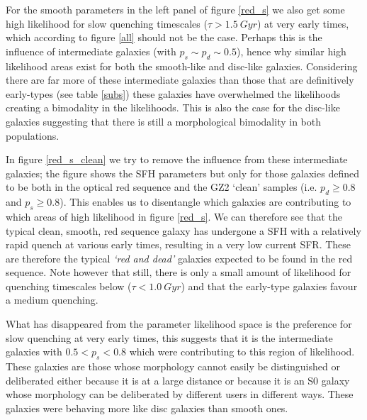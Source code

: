 \documentclass{mn2e}
\begin{document}
For the smooth parameters in the left panel of figure \ref{red_s} we also get some high likelihood for slow quenching timescales ($\tau > 1.5~Gyr$) at very early times, which according to figure \ref{all} should not be the case. Perhaps this is the influence of intermediate galaxies (with $p_s \sim p_d \sim 0.5$), hence why similar high likelihood areas exist for both the smooth-like and disc-like galaxies. Considering there are far more of these intermediate galaxies than those that are definitively early-types (see table \ref{subs}) these galaxies have overwhelmed the likelihoods creating a bimodality in the likelihoods. This is also the case for the disc-like galaxies suggesting that there is still a morphological bimodality in both populations.

In figure \ref{red_s_clean} we try to remove the influence from these intermediate galaxies; the figure shows the SFH parameters but only for those galaxies defined to be both in the optical red sequence and the GZ2 `clean' samples (i.e. $p_d \geq 0.8$ and $p_s \geq 0.8$). This enables us to disentangle which galaxies are contributing to which areas of high likelihood in figure \ref{red_s}. We can therefore see that the typical clean, smooth, red sequence galaxy has undergone a SFH with a relatively rapid quench at various early times, resulting in a very low current SFR. These are therefore the typical \emph{`red and dead'} galaxies expected to be found in the red sequence. Note however that still, there is only a small amount of likelihood for quenching timescales below ($\tau < 1.0~Gyr$) and that the early-type galaxies favour a medium quenching. 

What has disappeared from the parameter likelihood space is the preference for slow quenching at very early times, this suggests that it is the intermediate galaxies with $0.5 < p_s < 0.8$ which were contributing to this region of likelihood. These galaxies are those whose morphology cannot easily be distinguished or deliberated either because it is at a large distance or because it is an S0 galaxy whose morphology can be deliberated by different users in different ways. These galaxies were behaving more like disc galaxies than smooth ones. 

\end{document}
